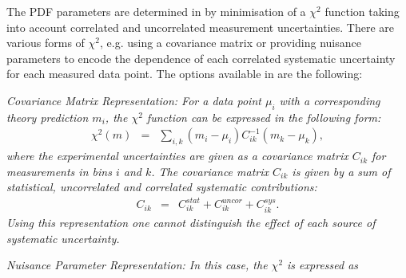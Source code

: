 The PDF parameters are determined in \fitter by minimisation of a
$\chi^2$ function taking into account correlated and uncorrelated measurement uncertainties.
There are various forms of $\chi^2$, 
e.g. using a covariance matrix or providing nuisance parameters to encode the dependence of 
each correlated systematic uncertainty for each measured data point.
The options available in \fitter are the following:
\begin{description}
\item \it {Covariance Matrix Representation:} \rm
For a data point $\mu_i$ with a corresponding theory prediction $m_i$, 
the $\chi^2$ function 
can be expressed in the following form:
%
\begin{eqnarray}
\chi^2 (m)& = & \sum_{i,k}(m_i-\mu_i)C^{-1}_{ik}(m_k-\mu_k),
\end{eqnarray}
where the experimental uncertainties are given as a covariance matrix $C_{ik}$ for measurements in bins $i$ and $k$.
The covariance matrix $C_{ik}$ is given by a sum of statistical, uncorrelated and correlated systematic contributions: 
\begin{eqnarray}
C_{ik}& = & C^{stat}_{ik}+C^{uncor}_{ik}+C^{sys}_{ik}.
\end{eqnarray}
Using this representation one cannot distinguish the effect of each source of systematic uncertainty. 
\item \it{Nuisance Parameter Representation:} \rm
In this case, the $\chi^2$ is expressed as
\label{sec:nuisance_representation}

\end{description}
